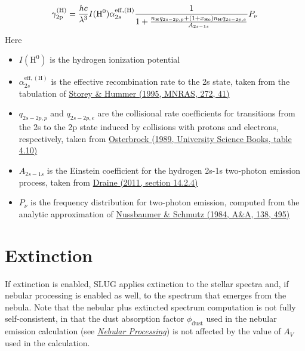 \documentclass[letterpaper,10pt,english]{sphinxmanual}
\begin{document}
\begin{gather}
\begin{split}\gamma_{\mathrm{2p}}^{(\mathrm{H})} = \frac{hc}{\lambda^3} I(\mathrm{H}^0) \alpha_{2s}^{\mathrm{eff,(H)}} \frac{1}{1 + \frac{n_{\mathrm{H}} q_{2s-2p,p} + (1+x_{\mathrm{He}}) n_{\mathrm{H}} q_{2s-2p,e}}{A_{2s-1s}}} P_\nu\end{split}\notag
\end{gather}
Here
\begin{itemize}
\item {} 
\(I(\mathrm{H}^0)\) is the hydrogen ionization potential

\item {} 
\(\alpha_{2s}^{\mathrm{eff,(H)}}\) is the effective recombination rate to the 2s state, taken from the tabulation of \href{http://adsabs.harvard.edu/abs/1995MNRAS.272...41S}{Storey \& Hummer (1995, MNRAS, 272, 41)}

\item {} 
\(q_{2s-2p,p}\) and \(q_{2s-2p,e}\) are the collisional rate coefficients for transitions from the 2s to the 2p state induced by collisions with protons and electrons, respectively, taken from \href{http://adsabs.harvard.edu/abs/1989agna.book.....O}{Osterbrock (1989, University Science Books, table 4.10)}

\item {} 
\(A_{2s-1s}\) is the Einstein coefficient for the hydrogen 2s-1s two-photon emission process, taken from \href{http://adsabs.harvard.edu/abs/2011piim.book.....D}{Draine (2011, section 14.2.4)}

\item {} 
\(P_\nu\) is the frequency distribution for two-photon emission, computed from the analytic approximation of \href{http://adsabs.harvard.edu/abs/1984A\%26A...138..495N}{Nussbaumer \& Schmutz (1984, A\&A, 138, 495)}

\end{itemize}


\section{Extinction}
\label{intro:extinction}\label{intro:ssec-extinction}
If extinction is enabled, SLUG applies extinction to the stellar spectra and, if nebular processing is enabled as well, to the spectrum that emerges from the nebula. Note that the nebular plus extincted spectrum computation is not fully self-consistent, in that the dust absorption factor \(\phi_{\mathrm{dust}}\) used in the nebular emission calculation (see {\hyperref[intro:ssec\string-nebula]{\emph{Nebular Processing}}}) is not affected by the value of \(A_V\) used in the calculation.
\end{document}
